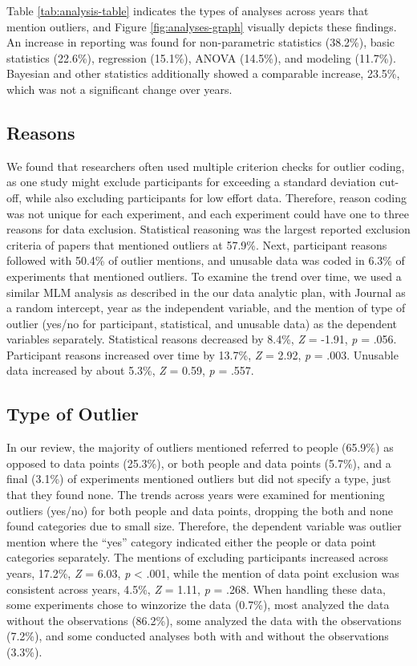 \documentclass[english,man]{apa6}
\theoremstyle{definition}
\theoremstyle{definition}
\theoremstyle{definition}
\theoremstyle{remark}
\begin{document}
Table \ref{tab:analysis-table} indicates the types of analyses across
years that mention outliers, and Figure \ref{fig:analyses-graph}
visually depicts these findings. An increase in reporting was found for
non-parametric statistics (38.2\%), basic statistics (22.6\%),
regression (15.1\%), ANOVA (14.5\%), and modeling (11.7\%). Bayesian and
other statistics additionally showed a comparable increase, 23.5\%,
which was not a significant change over years.

\subsection{Reasons}\label{reasons}

We found that researchers often used multiple criterion checks for
outlier coding, as one study might exclude participants for exceeding a
standard deviation cut-off, while also excluding participants for low
effort data. Therefore, reason coding was not unique for each
experiment, and each experiment could have one to three reasons for data
exclusion. Statistical reasoning was the largest reported exclusion
criteria of papers that mentioned outliers at 57.9\%. Next, participant
reasons followed with 50.4\% of outlier mentions, and unusable data was
coded in 6.3\% of experiments that mentioned outliers. To examine the
trend over time, we used a similar MLM analysis as described in the our
data analytic plan, with Journal as a random intercept, year as the
independent variable, and the mention of type of outlier (yes/no for
participant, statistical, and unusable data) as the dependent variables
separately. Statistical reasons decreased by 8.4\%, \emph{Z} = -1.91,
\emph{p} = .056. Participant reasons increased over time by 13.7\%,
\emph{Z} = 2.92, \emph{p} = .003. Unusable data increased by about
5.3\%, \emph{Z} = 0.59, \emph{p} = .557.

\subsection{Type of Outlier}\label{type-of-outlier}

In our review, the majority of outliers mentioned referred to people
(65.9\%) as opposed to data points (25.3\%), or both people and data
points (5.7\%), and a final (3.1\%) of experiments mentioned outliers
but did not specify a type, just that they found none. The trends across
years were examined for mentioning outliers (yes/no) for both people and
data points, dropping the both and none found categories due to small
size. Therefore, the dependent variable was outlier mention where the
\enquote{yes} category indicated either the people or data point
categories separately. The mentions of excluding participants increased
across years, 17.2\%, \emph{Z} = 6.03, \emph{p} \textless{} .001, while
the mention of data point exclusion was consistent across years, 4.5\%,
\emph{Z} = 1.11, \emph{p} = .268. When handling these data, some
experiments chose to winzorize the data (0.7\%), most analyzed the data
without the observations (86.2\%), some analyzed the data with the
observations (7.2\%), and some conducted analyses both with and without
the observations (3.3\%).
\end{document}
